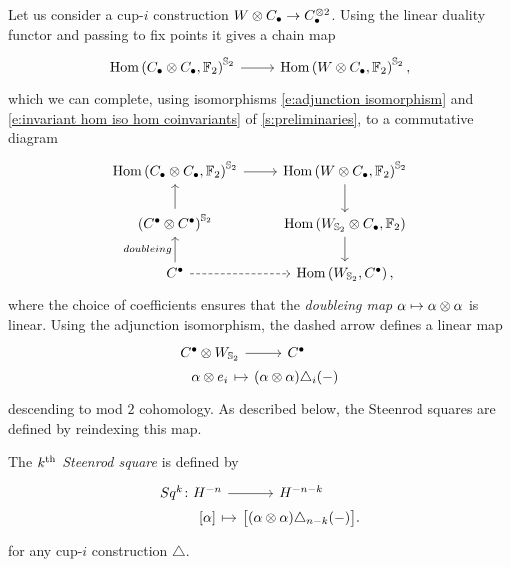 Let us consider a cup-$i$ construction $W \otimes C_\bullet \to C_\bullet^{\otimes 2}$.
Using the linear duality functor and passing to fix points it gives a chain map
\begin{equation*}
\begin{tikzcd}
\Hom\left(C_\bullet \ot C_\bullet, \Ftwo \right)^{\Sym_2} \arrow[r] &
\Hom\left(W \ot C_\bullet, \Ftwo \right)^{\Sym_2},
\end{tikzcd}
\end{equation*}
which we can complete, using isomorphisms \eqref{e:adjunction isomorphism} and \eqref{e:invariant hom iso hom coinvariants} of \cref{s:preliminaries}, to a commutative diagram
\begin{equation*}
\begin{tikzcd}
\Hom\left(C_\bullet \ot C_\bullet, \Ftwo \right)^{\Sym_2} \arrow[r] &
\Hom\left(W \ot C_\bullet, \Ftwo \right)^{\Sym_2} \arrow[d] \\
\left(C^\bullet \ot C^\bullet\right)^{\Sym_2} \arrow[u]&
\Hom\left(W_{\Sym_2} \ot C_\bullet, \Ftwo \right) \arrow[d] \\
C^\bullet \arrow[u, "doubleing"] \arrow[r, dashed]&
\Hom\left(W_{\Sym_2}, C^\bullet\right),
\end{tikzcd}
\end{equation*}
where the choice of coefficients ensures that the \textit{doubleing map} $\alpha \mapsto \alpha \otimes \alpha$ is linear.
Using the adjunction isomorphism, the dashed arrow defines a linear map
\begin{equation} \label{e:Steenrod squares parameterized}
\begin{tikzcd}[row sep=0pt, column sep = small]
C^\bullet \ot W_{\Sym_2} \arrow[r] &[-10pt] C^\bullet \\
\alpha \ot e_i \arrow[r, |->] & (\alpha \ot \alpha)\triangle_i(-)
\end{tikzcd}
\end{equation}
descending to mod $2$ cohomology.
As described below, the Steenrod squares are defined by reindexing this map.
\begin{definition} \label{d:steenrod squares}
	The \textit{$k^{\mathrm{th}}$ Steenrod square} is defined by
	\begin{equation} \label{e:steenrod squares}
	\begin{tikzcd}[row sep=0pt, column sep=tiny]
	Sq^k \colon H^{-n} \arrow[r] & H^{-n-k} \\
	\phantom{Sq^k \colon}{[\alpha]} \arrow[r, |->] & \big[ (\alpha \ot \alpha)\triangle_{n-k}(-) \big].
	\end{tikzcd}
	\end{equation}
	for any cup-$i$ construction $\triangle$.
\end{definition}

